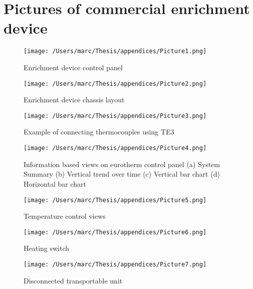 \section*{Pictures of commercial enrichment device}

\begin{figure}[H]
    \texttt{[image: /Users/marc/Thesis/appendices/Picture1.png]}
    \caption{Enrichment device control panel}
  \end{figure}

  \begin{figure}[H]
    \texttt{[image: /Users/marc/Thesis/appendices/Picture2.png]}
    \caption{Enrichment device chassis layout}
  \end{figure}

  \begin{figure}[H]
    \texttt{[image: /Users/marc/Thesis/appendices/Picture3.png]}
    \caption{Example of connecting thermocouples using TE3}
  \end{figure}

  \begin{figure}[H]
    \texttt{[image: /Users/marc/Thesis/appendices/Picture4.png]}
    \caption{Information based views on eurotherm control panel (a) System Summary (b) Vertical trend over time (c) Vertical bar chart (d) Horizontal bar chart}
  \end{figure}

  \begin{figure}[H]
    \texttt{[image: /Users/marc/Thesis/appendices/Picture5.png]}
    \caption{Temperature control views}
  \end{figure}

  \begin{figure}[H]
    \texttt{[image: /Users/marc/Thesis/appendices/Picture6.png]}
    \caption{Heating switch}
  \end{figure}

  \begin{figure}[H]
    \texttt{[image: /Users/marc/Thesis/appendices/Picture7.png]}
    \caption{Disconnected transportable unit}
  \end{figure}
